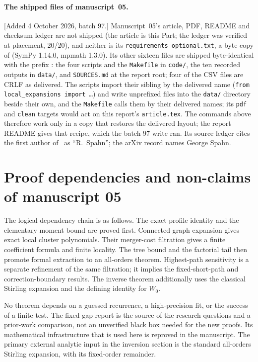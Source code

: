 \documentclass[11pt]{article}
\numberwithin{equation}{section}
\theoremstyle{definition}
\theoremstyle{remark}
\theoremstyle{definition}
\begin{document}
\paragraph{The shipped files of manuscript~05.} [Added 4 October 2026,
batch 97.] Manuscript~05's article, PDF, README and checksum ledger are not
shipped (the article is this Part; the ledger was verified at placement,
20/20), and neither is its \texttt{requirements-optional.txt}, a byte copy
of  (SymPy 1.14.0, mpmath 1.3.0).
Its other sixteen files are shipped byte-identical with the prefix
: the four scripts and the \texttt{Makefile} in
\texttt{code/}, the ten recorded outputs in \texttt{data/}, and
\texttt{SOURCES.md} at the report root; four of the CSV files are CRLF as
delivered. The scripts import their sibling by the delivered name
(\texttt{from local\_expansions import \ldots}) and write unprefixed files
into the \texttt{data/} directory beside their own, and the \texttt{Makefile}
calls them by their delivered names; its \texttt{pdf} and \texttt{clean}
targets would act on this report's \texttt{article.tex}. The commands above
therefore work only in a copy that restores the delivered layout; the report
README gives that recipe, which the batch-97 write ran. Its source ledger
cites the first author of~\cite{spahn} as ``R.~Spahn''; the arXiv record
names George Spahn.

\section{Proof dependencies and non-claims of manuscript 05}
\label{spf:mg:app:dependencies}

The logical dependency chain is as follows. The exact profile identity
and the elementary moment bound are proved first. Connected graph
expansion gives exact local cluster polynomials. Their merger-cost
filtration gives a finite coefficient formula and finite locality. The
tree bound and the factorial tail then promote formal extraction to an
all-orders theorem. Highest-path sensitivity is a separate refinement of
the same filtration; it implies the fixed-short-path and correction-boundary
results. The inverse theorem additionally uses the classical Stirling
expansion and the defining identity for $W_0$.

No theorem depends on a guessed recurrence, a high-precision fit, or the
success of a finite test. The fixed-gap report is the source of the
research questions and a prior-work comparison, not an unverified black
box needed for the new proofs. Its mathematical infrastructure that is
used here is reproved in the manuscript. The primary external analytic
input in the inversion section is the standard all-orders Stirling
expansion, with its fixed-order remainder.
\end{document}
